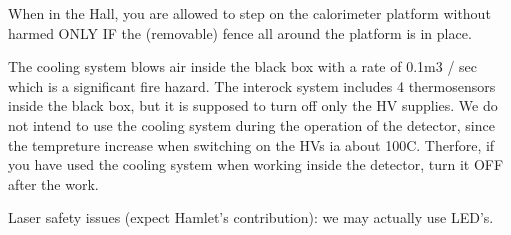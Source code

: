 \documentclass{chowto}
\begin{document}
When in the Hall, you are allowed to step on the calorimeter platform without harmed 
ONLY IF the (removable) fence all around the platform is in place.

The cooling system blows air inside the black box with a rate of 0.1m3 / sec which is a 
significant fire hazard. The interock system includes 4 thermosensors inside the black box, 
but it is supposed to turn off only the HV supplies. We do not intend to use the cooling 
system during the operation of the detector, since the tempreture increase when switching 
on the HVs ia about 100C. Therfore, if you have used the cooling system when working inside 
the detector, turn it OFF after the work.

Laser safety issues (expect Hamlet's contribution): we may actually use LED's. 
\end{document}
